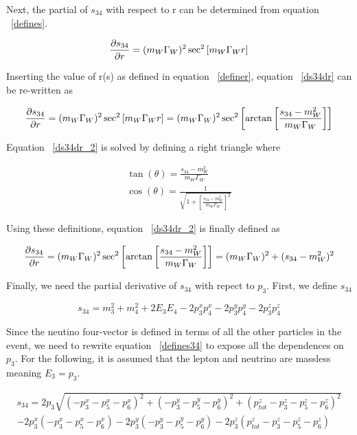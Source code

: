 Next, the partial of $s_{34}$ with respect to r can be determined from equation
~\ref{defines}.


\begin{equation}
\label{ds34dr}
\frac{\partial s_{34}}{\partial r} = (m_{W} \Gamma_{W})^{2} \sec^{2} \left[m_{W} \Gamma_{W} r \right]
\end{equation}

Inserting the value of r(s) as defined in equation ~\ref{definer}, equation
~\ref{ds34dr} can be re-written as

\begin{equation}
\label{ds34dr_2}
\frac{\partial s_{34}}{\partial r} = (m_{W} \Gamma_{W})^{2} \sec^{2} \left[m_{W} \Gamma_{W} r \right] =
(m_{W} \Gamma_{W})^{2} \sec^{2} \left[\arctan \left[ \frac{s_{34} - m_{W}^{2}}{m_{W}
\Gamma_{W}}  \right] \right]
\end{equation}

Equation ~\ref{ds34dr_2} is solved by defining a right triangle where

\begin{eqnarray}
\nonumber
\tan(\theta) = \frac{s_{34}-m_{W}^{2}}{m_{W}\Gamma_{W}} \\
\cos(\theta) = \frac{1}{\sqrt{1+\left[ \frac{s_{34}-m_{W}^{2}}{m_{W}\Gamma_{W}}
\right]^{2}}}
\end{eqnarray}

Using these definitions, equation ~\ref{ds34dr_2} is finally defined as

\begin{equation}
\label{ds34dr_3}
\frac{\partial s_{34}}{\partial r} = (m_{W} \Gamma_{W})^{2} \sec^{2} \left[\arctan \left[ \frac{s_{34} - m_{W}^{2}}{m_{W}
\Gamma_{W}}  \right] \right] = (m_{W}\Gamma_{W})^{2} + (s_{34} - m_{W}^{2})^{2}
\end{equation}

Finally, we need the partial derivative of $s_{34}$ with repect to
$p_{3}$. First, we define $s_{34}$

\begin{equation}
\label{defines34}
s_{34} = m_{3}^{2} + m_{4}^{2} + 2E_{3}E_{4} - 2p_{3}^{x}p_{4}^{x} - 2p_{3}^{y}p_{4}^{y} - 2p_{3}^{z}p_{4}^{z}
\end{equation}

Since the neutino four-vector is defined in terms of all the other particles in
the event, we need to rewrite equation ~\ref{defines34} to expose all the
dependences on $p_{3}$. For the following, it is assumed that the lepton and
neutrino are massless meaning $E_{3} = p_{3}$. 

\begin{eqnarray}
\label{defines34_2}
\nonumber
s_{34} = 2p_{3}\sqrt{(-p_{3}^{x} -p_{5}^{x} -p_{6}^{x})^{2} + (-p_{3}^{y} -p_{5}^{y} -p_{6}^{y})^{2} + (p_{tot}^{z} -p_{3}^{z} -p_{5}^{z} -p_{6}^{z})^{2}} \\
- 2p_{3}^{x}(-p_{3}^{x} -p_{5}^{x} -p_{6}^{x}) -
2p_{3}^{y}(-p_{3}^{y} -p_{5}^{y} -p_{6}^{y}) - 2p_{3}^{z}(p_{tot}^{z} -p_{3}^{z} -p_{5}^{z} -p_{6}^{z})
\end{eqnarray}

